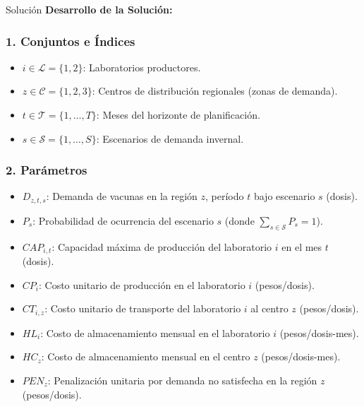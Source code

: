 \documentclass[11pt, a4paper]{article}
\begin{document}
  \medskip
  \begin{ejercicio}{Solución}
  \textbf{Desarrollo de la Solución:}

  \subsubsection*{1. Conjuntos e Índices}
  \begin{itemize}
    \item $i \in \mathcal{L} = \{1, 2\}$: Laboratorios productores.
    \item $z \in \mathcal{C} = \{1, 2, 3\}$: Centros de distribución regionales (zonas de demanda).
    \item $t \in \mathcal{T} = \{1, \dots, T\}$: Meses del horizonte de planificación.
    \item $s \in \mathcal{S} = \{1, \dots, S\}$: Escenarios de demanda invernal.
  \end{itemize}

  \subsubsection*{2. Parámetros}
  \begin{itemize}
    \item $D_{z,t,s}$: Demanda de vacunas en la región $z$, período $t$ bajo escenario $s$ (dosis).
    \item $P_s$: Probabilidad de ocurrencia del escenario $s$ (donde $\sum_{s \in \mathcal{S}} P_s = 1$).
    \item $CAP_{i,t}$: Capacidad máxima de producción del laboratorio $i$ en el mes $t$ (dosis).
    \item $CP_i$: Costo unitario de producción en el laboratorio $i$ (pesos/dosis).
    \item $CT_{i,z}$: Costo unitario de transporte del laboratorio $i$ al centro $z$ (pesos/dosis).
    \item $HL_i$: Costo de almacenamiento mensual en el laboratorio $i$ (pesos/dosis-mes).
    \item $HC_z$: Costo de almacenamiento mensual en el centro $z$ (pesos/dosis-mes).
    \item $PEN_z$: Penalización unitaria por demanda no satisfecha en la región $z$ (pesos/dosis).
  \end{itemize}


\end{ejercicio}
\end{document}

